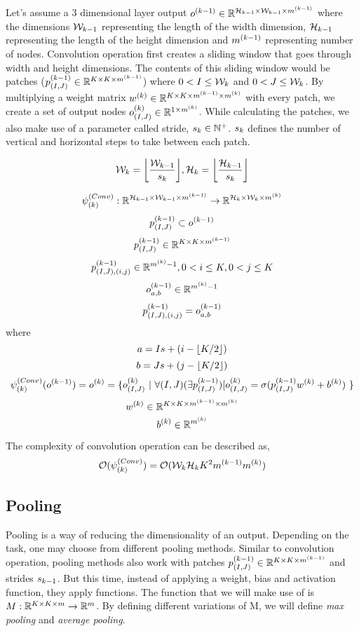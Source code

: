 Let's assume a 3 dimensional layer output $\ok{k-1} \inreal{\heightk{k-1} \times \widthk{k-1} \times \mk{k-1}}$ where the dimensions $\widthk{k-1}$ representing the length of the width dimension, $\heightk{k-1}$ representing the length of the height dimension and $\mk{k-1}$ representing number of nodes. Convolution operation first creates a sliding window that goes through width and height dimensions. The contents of this sliding window would be patches ($\pki{k-1}{(I,J)} \inreal{\kernelsize \times \kernelsize \times \mk{k-1}}$) where $0 < I \leq \widthk{k}$ and $0 < J \leq \widthk{k}$. By multiplying a weight matrix $\wk{k} \inreal{\kernelsize \times \kernelsize \times \mk{k-1} \times \mk{k}}$ with every patch, we create a set of output nodes $\oki{k}{(I,J)} \inreal{1 \times \mk{k}}$. While calculating the patches, we also make use of a parameter called stride, $\sk{k} \in \mathbb{N}^+$. $\sk{k}$ defines the number of vertical and horizontal steps to take between each patch.

$$ \widthk{k} = \floor*{\frac{\widthk{k-1}}{\sk{k}}}, \heightk{k} = \floor*{\frac{\heightk{k-1}}{\sk{k}}}$$

$$ \convk{k} : \imagedimsk{k-1} \rightarrow \imagedimsk{k} $$
$$ \pki{k-1}{(I,J)} \subset \ok{k-1}$$
$$ \pki{k-1}{(I,J)} \inreal{\kernelsize \times \kernelsize \times \mk{k-1}} $$
$$ \pki{k-1}{(I,J),(i,j)} \inreal{\mk{k}-1} , 0 < i \leq \kernelsize, 0 < j \leq \kernelsize$$
$$ \oki{k-1}{a,b} \inreal{\mk{k}-1}  $$
$$ \pki{k-1}{(I,J),(i,j)} = \oki{k-1}{a,b} $$
where
$$ a = I\s + (i - \floor*{\kernelsize/2}) $$
$$ b = J\s + (j - \floor*{\kernelsize/2}) $$
$$\convk{k}(\ok{k-1}) = \ok{k} = \{\oki{k}{(I,J)} \ | \ \forall (I,J) (\exists \pki{k-1}{(I,J)}) [ \oki{k}{(I,J)} = \sigma(\pki{k-1}{(I,J)} \wk{k} + \bk{k})\ \}  $$
$$ \wk{k} \inreal{\kernelsize \times \kernelsize \times \mk{k-1} \times \mk{k}} $$
$$ \bk{k} \inreal{\mk{k}}$$

The complexity of convolution operation can be described as,
$$ \bigo{\convk{k}} = \bigo{\widthk{k}\heightk{k}\kernelsize^2\mk{k-1}\mk{k}} $$


\subsection{Pooling}
Pooling is a way of reducing the dimensionality of an output. Depending on the task, one may choose from different pooling methods. Similar to convolution operation, pooling methods also work with patches $\pki{k-1}{(I,J)} \inreal{\kernelsize \times \kernelsize \times \mk{k-1}}$ and strides $\sk{k-1}$. But this time, instead of applying a weight, bias and activation function, they apply functions. 
The function that we will make use of is $ M : \real{\kernelsize \times \kernelsize \times m} \rightarrow \real{m}$. By defining different variations of M, we will define \textit{max pooling} and \textit{average pooling}.
